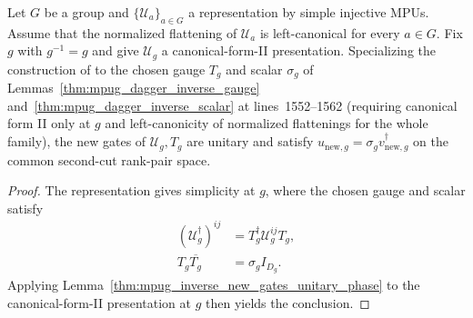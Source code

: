\begin{lemma}
    \label{thm:mpug_involutive_new_gates}
    \leanok
    Let $G$ be a group and $\{\mathcal U_a\}_{a\in G}$ a representation
    by simple injective MPUs. Assume that the normalized flattening of
    $\mathcal U_a$ is left-canonical for every $a\in G$. Fix $g$ with
    $g^{-1}=g$ and give $\mathcal U_g$ a canonical-form-II presentation.
    Specializing the construction of
    \cite[lines~5440--5487]{FrancoRubio2025MPUGauging} to the chosen gauge $T_g$
    and scalar $\sigma_g$ of Lemmas~\ref{thm:mpug_dagger_inverse_gauge}
    and~\ref{thm:mpug_dagger_inverse_scalar} at lines~1552--1562 (requiring
    canonical form II only at $g$ and left-canonicity of normalized flattenings
    for the whole family), the new gates of $\mathcal U_g,T_g$ are unitary and
    satisfy $u_{\mathrm{new},g}=\sigma_g v_{\mathrm{new},g}^\dagger$ on the
    common second-cut rank-pair space.
\end{lemma}
\begin{proof}\leanok
    The representation gives simplicity at $g$, where the chosen gauge and
    scalar satisfy
    \begin{align}
        (\mathcal U_g^\dagger)^{ij}
                          & =T_g^\dagger\mathcal U_g^{ij}T_g, \\
        T_g\overline{T_g} & =\sigma_g I_{D_g}.
    \end{align}
    Applying Lemma~\ref{thm:mpug_inverse_new_gates_unitary_phase} to the
    canonical-form-II presentation at $g$ then yields the conclusion.
\end{proof}

